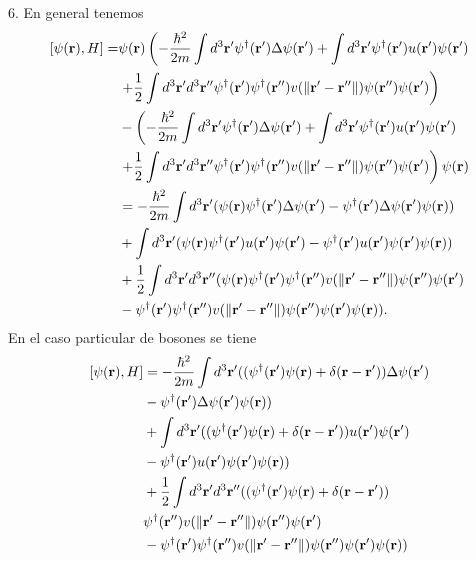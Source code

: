 \documentclass{article}
\begin{document}
6. En general tenemos
\begin{align}
\begin{split}
[\psi(\vb{r}),H]=&\psi(\vb{r})\left(-\frac{\hbar^2}{2m}\int d^3\vb{r}' \psi^\dagger(\vb{r}')\Delta\psi(\vb{r}')+\int d^3\vb{r}'\psi^\dagger(\vb{r}')u(\vb{r}')\psi(\vb{r}')\right.\\
&\left.+\frac{1}{2}\int d^3\vb{r}'d^3\vb{r}''\psi^\dagger(\vb{r}')\psi^\dagger(\vb{r}'')v(\|\vb{r}'-\vb{r}''\|)\psi(\vb{r}'')\psi(\vb{r}')\right)\\
&-\left(-\frac{\hbar^2}{2m}\int d^3\vb{r}' \psi^\dagger(\vb{r}')\Delta\psi(\vb{r}')+\int d^3\vb{r}'\psi^\dagger(\vb{r}')u(\vb{r}')\psi(\vb{r}')\right.\\
&\left.+\frac{1}{2}\int d^3\vb{r}'d^3\vb{r}''\psi^\dagger(\vb{r}')\psi^\dagger(\vb{r}'')v(\|\vb{r}'-\vb{r}''\|)\psi(\vb{r}'')\psi(\vb{r}')\right)\psi(\vb{r})\\
&=-\frac{\hbar^2}{2m}\int d^3\vb{r}'(\psi(\vb{r})\psi^\dagger(\vb{r}')\Delta\psi(\vb{r}')-\psi^\dagger(\vb{r}')\Delta\psi(\vb{r}')\psi(\vb{r}))\\
&+\int d^3\vb{r}'(\psi(\vb{r})\psi^\dagger(\vb{r}')u(\vb{r}')\psi(\vb{r}')-\psi^\dagger(\vb{r}')u(\vb{r}')\psi(\vb{r}')\psi(\vb{r}))\\
&+\frac{1}{2}\int d^3\vb{r}'d^3\vb{r}''(\psi(\vb{r})\psi^\dagger(\vb{r}')\psi^\dagger(\vb{r}'')v(\|\vb{r}'-\vb{r}''\|)\psi(\vb{r}'')\psi(\vb{r}')\\
&-\psi^\dagger(\vb{r}')\psi^\dagger(\vb{r}'')v(\|\vb{r}'-\vb{r}''\|)\psi(\vb{r}'')\psi(\vb{r}')\psi(\vb{r})).
\end{split}
\end{align}
En el caso particular de bosones se tiene
\begin{align}
\begin{split}
[\psi(\vb{r}),H]&=-\frac{\hbar^2}{2m}\int d^3\vb{r}'((\psi^\dagger(\vb{r}')\psi(\vb{r})+\delta(\vb{r}-\vb{r}'))\Delta\psi(\vb{r}')\\
&-\psi^\dagger(\vb{r}')\Delta\psi(\vb{r}')\psi(\vb{r}))\\
&+\int d^3\vb{r}'((\psi^\dagger(\vb{r}')\psi(\vb{r})+\delta(\vb{r}-\vb{r}'))u(\vb{r}')\psi(\vb{r}')\\
&-\psi^\dagger(\vb{r}')u(\vb{r}')\psi(\vb{r}')\psi(\vb{r}))\\
&+\frac{1}{2}\int d^3\vb{r}'d^3\vb{r}''((\psi^\dagger(\vb{r}')\psi(\vb{r})+\delta(\vb{r}-\vb{r}'))\\
&\psi^\dagger(\vb{r}'')v(\|\vb{r}'-\vb{r}''\|)\psi(\vb{r}'')\psi(\vb{r}')\\
&-\psi^\dagger(\vb{r}')\psi^\dagger(\vb{r}'')v(\|\vb{r}'-\vb{r}''\|)\psi(\vb{r}'')\psi(\vb{r}')\psi(\vb{r}))
\end{split}
\end{align}
\end{document}
